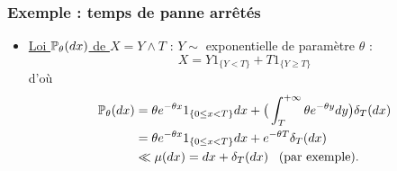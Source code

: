 %
%
%
\begin{frame}
\frametitle{Exemple : temps de panne  arrêtés}
\begin{itemize}
\item \underline{Loi $\operatorname{{\mathbb P}}_\theta(dx)$ de $X = Y \wedge T$} : $Y \sim$ exponentielle de paramètre $\theta$ :
$$\boxed{X = Y 1_{\{Y < T\}} + T 1_{\{Y \geq T\}}}$$
d'où
\begin{align*}\operatorname{{\mathbb P}}_\theta(dx) &
= \theta e^{-\theta x} 1_{\{0 \leq x < T\}} dx+ \big(\int_{T}^{+\infty}\theta e^{-\theta y}dy\big) \delta_T(dx)\\
&= \theta e^{-\theta x} 1_{\{0 \leq x < T\}}dx + e^{-\theta T} \delta_T(dx) \\
&\ll \mu(dx) = dx + \delta_T(dx)\;\;\; \text{(par exemple)}.
\end{align*}
\end{itemize}
\end{frame}


